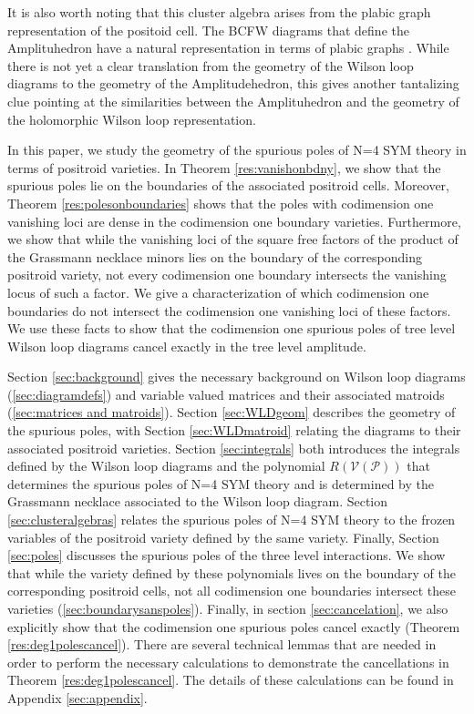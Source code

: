 \documentclass[11pt]{article}
\newcommand{\cP}{\mathcal{P}}
\newcommand{\cV}{\mathcal{V}}
\newcommand{\VP}{\cV(\cP)}
\theoremstyle{remark}
\theoremstyle{definition}
\begin{document}
It is also worth noting that this cluster algebra arises from the plabic graph representation of the positoid cell. The BCFW diagrams that define the Amplituhedron have a natural representation in terms of plabic graphs \cite[Section 5]{AmplituhedronDecomposition}. While there is not yet a clear translation from the geometry of the Wilson loop diagrams to the geometry of the Amplitudehedron, this gives another tantalizing clue pointing at the similarities between the Amplituhedron and the geometry of the holomorphic Wilson loop representation. 

In this paper, we study the geometry of the spurious poles of N=4 SYM theory in terms of positroid varieties. In Theorem \ref{res:vanishonbdny}, we show that the spurious poles lie on the boundaries of the associated positroid cells. Moreover, Theorem \ref{res:polesonboundaries} shows that the poles with codimension one vanishing loci are dense in the codimension one boundary varieties. Furthermore, we show that while the vanishing loci of the square free factors of the product of the Grassmann necklace minors lies on the boundary of the corresponding positroid variety, not every codimension one boundary intersects the vanishing locus of such a factor. We give a characterization of which codimension one boundaries do not intersect the codimension one vanishing loci of these factors. We use these facts to show that the codimension one spurious poles of tree level Wilson loop diagrams cancel exactly in the tree level amplitude. 

Section \ref{sec:background} gives the necessary background on Wilson loop diagrams (\ref{sec:diagramdefs}) and variable valued matrices and their associated matroids (\ref{sec:matrices and matroids}). Section \ref{sec:WLDgeom} describes the geometry of the spurious poles, with Section \ref{sec:WLDmatroid} relating the diagrams to their associated positroid varieties. Section \ref{sec:integrals} both introduces the integrals defined by the Wilson loop diagrams and the polynomial $R(\VP)$ that determines the spurious poles of N=4 SYM theory and is determined by the Grassmann necklace associated to the Wilson loop diagram. Section \ref{sec:clusteralgebras} relates the spurious poles of N=4 SYM theory to the frozen variables of the positroid variety defined by the same variety. Finally, Section \ref{sec:poles} discusses the spurious poles of the three level interactions. We show that while the variety defined by these polynomials lives on the boundary of the corresponding positroid cells, not all codimension one boundaries intersect these varieties (\ref{sec:boundarysanspoles}). Finally, in section \ref{sec:cancelation}, we also explicitly show that the codimension one spurious poles cancel exactly (Theorem \ref{res:deg1polescancel}). There are several technical lemmas that are needed in order to perform the necessary calculations to demonstrate the cancellations in  Theorem \ref{res:deg1polescancel}. The details of these calculations can be found in Appendix \ref{sec:appendix}.
 
\end{document}
